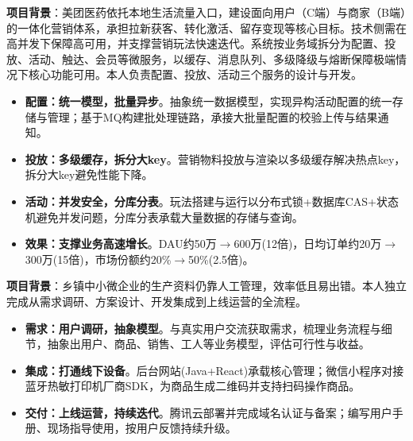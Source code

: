 \documentclass{resume}
\begin{document}
\begin{onehalfspacing}
\textbf{项目背景}：美团医药依托本地生活流量入口，建设面向用户（C端）与商家（B端）的一体化营销体系，承担拉新获客、转化激活、留存变现等核心目标。技术侧需在高并发下保障高可用，并支撑营销玩法快速迭代。系统按业务域拆分为配置、投放、活动、触达、会员等微服务，以缓存、消息队列、多级降级与熔断保障极端情况下核心功能可用。本人负责配置、投放、活动三个服务的设计与开发。\\

\begin{itemize}
    \item \textbf{配置：统一模型，批量异步}。抽象统一数据模型，实现异构活动配置的统一存储与管理；基于MQ构建批处理链路，承接大批量配置的校验上传与结果通知。
    \item \textbf{投放：多级缓存，拆分大key}。营销物料投放与渲染以多级缓存解决热点key，拆分大key避免性能下降。
    \item \textbf{活动：并发安全，分库分表}。玩法搭建与运行以分布式锁+数据库CAS+状态机避免并发问题，分库分表承载大量数据的存储与查询。
    \item \textbf{效果：支撑业务高速增长}。DAU约50万$\rightarrow$600万(12倍)，日均订单约20万$\rightarrow$300万(15倍)，市场份额约20\%$\rightarrow$50\%(2.5倍)。
\end{itemize}
\end{onehalfspacing}

\begin{onehalfspacing}
\textbf{项目背景}：乡镇中小微企业的生产资料仍靠人工管理，效率低且易出错。本人独立完成从需求调研、方案设计、开发集成到上线运营的全流程。\\

\begin{itemize}
    \item \textbf{需求：用户调研，抽象模型}。与真实用户交流获取需求，梳理业务流程与细节，抽象出用户、商品、销售、工人等业务模型，评估可行性与收益。
    \item \textbf{集成：打通线下设备}。后台网站(Java+React)承载核心管理；微信小程序对接蓝牙热敏打印机厂商SDK，为商品生成二维码并支持扫码操作商品。
    \item \textbf{交付：上线运营，持续迭代}。腾讯云部署并完成域名认证与备案；编写用户手册、现场指导使用，按用户反馈持续升级。
\end{itemize}
\end{onehalfspacing}
\end{document}
